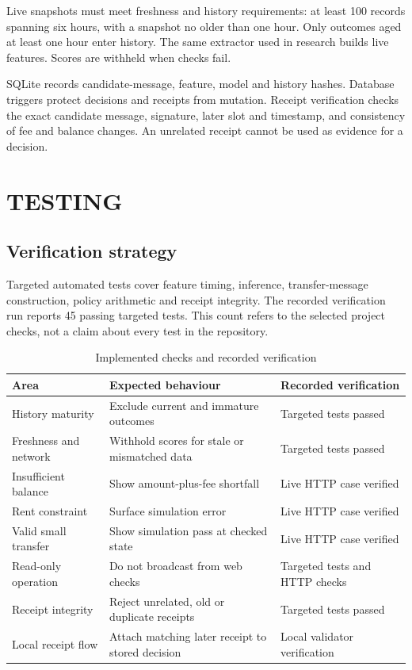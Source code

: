 \documentclass[12pt,a4paper,oneside]{report}
\begin{document}
Live snapshots must meet freshness and history requirements: at least 100 records spanning six hours, with a snapshot no older than one hour. Only outcomes aged at least one hour enter history. The same extractor used in research builds live features. Scores are withheld when checks fail.

SQLite records candidate-message, feature, model and history hashes. Database triggers protect decisions and receipts from mutation. Receipt verification checks the exact candidate message, signature, later slot and timestamp, and consistency of fee and balance changes. An unrelated receipt cannot be used as evidence for a decision.
\chapter{TESTING}
\section{Verification strategy}
Targeted automated tests cover feature timing, inference, transfer-message construction, policy arithmetic and receipt integrity. The recorded verification run reports 45 passing targeted tests. This count refers to the selected project checks, not a claim about every test in the repository.
\begin{table}[ht]\centering\caption{Implemented checks and recorded verification}
\small\begin{tabularx}{\textwidth}{p{35mm}YY}\toprule Area&Expected behaviour&Recorded verification\\\midrule
History maturity&Exclude current and immature outcomes&Targeted tests passed\\
Freshness and network&Withhold scores for stale or mismatched data&Targeted tests passed\\
Insufficient balance&Show amount-plus-fee shortfall&Live HTTP case verified\\
Rent constraint&Surface simulation error&Live HTTP case verified\\
Valid small transfer&Show simulation pass at checked state&Live HTTP case verified\\
Read-only operation&Do not broadcast from web checks&Targeted tests and HTTP checks\\
Receipt integrity&Reject unrelated, old or duplicate receipts&Targeted tests passed\\
Local receipt flow&Attach matching later receipt to stored decision&Local validator verification\\\bottomrule\end{tabularx}\end{table}
\end{document}
